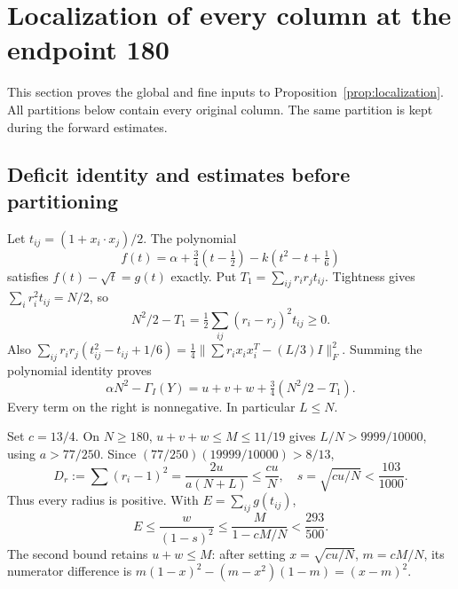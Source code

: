 \section{Localization of every column at the endpoint 180}\label{app:global}
This section proves the global and fine inputs to
Proposition~\ref{prop:localization}. All partitions below contain every
original column. The same partition is kept during the forward estimates.

\subsection{Deficit identity and estimates before partitioning}
Let $t_{ij}=(1+x_i\cdot x_j)/2$. The polynomial
\[
 f(t)=\alpha+\tfrac34(t-\tfrac12)-k(t^2-t+\tfrac16)
\]
satisfies $f(t)-\sqrt t=g(t)$ exactly. Put
$T_1=\sum_{ij}r_ir_jt_{ij}$. Tightness gives
$\sum_i r_i^2t_{ij}=N/2$, so
\[
 N^2/2-T_1=\tfrac12\sum_{ij}(r_i-r_j)^2t_{ij}\ge0.
\]
Also
$\sum_{ij}r_ir_j(t_{ij}^2-t_{ij}+1/6)
=\frac14\|\sum r_ix_ix_i^T-(L/3)I\|_F^2$.
Summing the polynomial identity proves
\begin{equation}\label{app:global:deficit}
 \alpha N^2-\Gamma_I(Y)=u+v+w+\tfrac34(N^2/2-T_1).
\end{equation}
Every term on the right is nonnegative. In particular $L\le N$.

Set $c=13/4$. On $N\ge180$, $u+v+w\le M\le11/19$ gives
$L/N>9999/10000$, using $a>77/250$. Since
$(77/250)(19999/10000)>8/13$,
\begin{equation}\label{app:global:radial}
 D_r:=\sum(r_i-1)^2=\frac{2u}{a(N+L)}\le\frac{cu}{N},
 \quad s=\sqrt{cu/N}<\frac{103}{1000}.
\end{equation}
Thus every radius is positive. With $E=\sum_{ij}g(t_{ij})$,
\begin{equation}\label{app:global:energy}
 E\le\frac{w}{(1-s)^2}\le\frac{M}{1-cM/N}<\frac{293}{500}.
\end{equation}
The second bound retains $u+w\le M$: after setting $x=\sqrt{cu/N}$,
$m=cM/N$, its numerator difference is
$m(1-x)^2-(m-x^2)(1-m)=(x-m)^2$.

